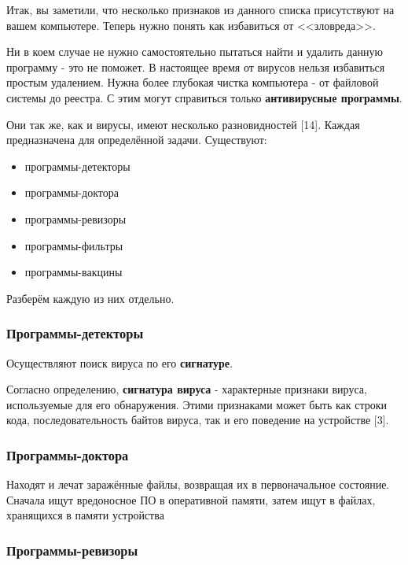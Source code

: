 \documentclass[12pt]{article}
\begin{document}
Итак, вы заметили, что несколько признаков из данного списка присутствуют на вашем компьютере. Теперь нужно понять как избавиться от <<зловреда>>.

Ни в коем случае не нужно самостоятельно пытаться найти и удалить данную программу - это не поможет. В настоящее время от вирусов нельзя избавиться простым удалением. Нужна более глубокая чистка компьютера - от файловой системы до реестра. С этим могут справиться только \textbf{антивирусные программы}.

Они так же, как и вирусы, имеют несколько разновидностей [14]. Каждая предназначена для определённой задачи.
Существуют:

\begin{itemize}
    \item программы-детекторы
    \item программы-доктора
    \item программы-ревизоры
    \item программы-фильтры
    \item программы-вакцины
\end{itemize}

Разберём каждую из них отдельно.

\subsubsection*{Программы-детекторы}
Осуществляют поиск вируса по его \textbf{сигнатуре}.

Согласно определению, \textbf{сигнатура вируса} - характерные признаки вируса, используемые для его обнаружения. Этими признаками может быть как строки кода, последовательность байтов вируса, так и его поведение на устройстве [3].

\subsubsection*{Программы-доктора}

Находят и лечат заражённые файлы, возвращая их в первоначальное состояние. Сначала ищут вредоносное ПО в оперативной памяти, затем ищут в файлах, хранящихся в памяти устройства

\subsubsection*{Программы-ревизоры}
\end{document}
